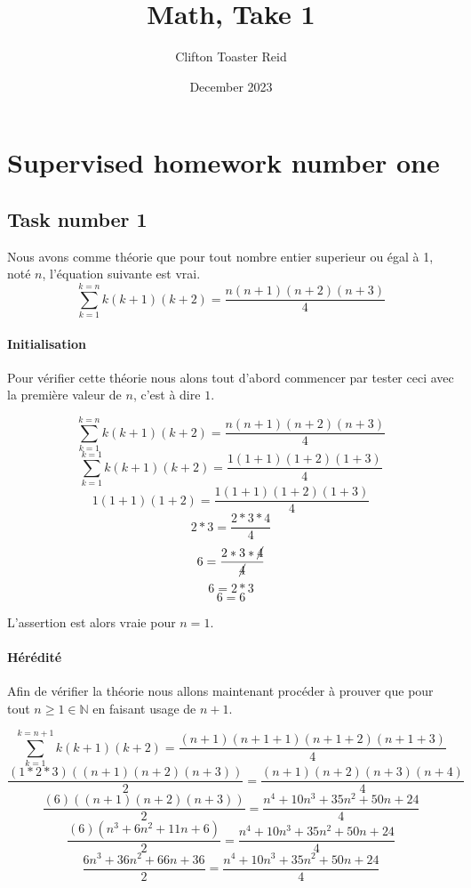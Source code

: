 \documentclass{article}
\title{Math, Take 1}
\author{Clifton Toaster Reid}
\date{December 2023}
\begin{document}
\maketitle

\section{Supervised homework number one}
\subsection{Task number 1}

Nous avons comme théorie que pour tout nombre entier superieur ou égal à 1, noté $n$, l'équation suivante est vrai.
\[\sum_{k=1}^{k=n} k(k+1)(k+2) = \frac{n(n+1)(n+2)(n+3)}{4}\]

\paragraph*{Initialisation}

Pour vérifier cette théorie nous alons tout d'abord commencer par tester ceci avec la première valeur de $n$, c'est à dire $1$.

\[\sum_{k=1}^{k=n} k(k+1)(k+2) = \frac{n(n+1)(n+2)(n+3)}{4}\]
\[\sum_{k=1}^{k=1} k(k+1)(k+2) = \frac{1(1+1)(1+2)(1+3)}{4}\]
\[1(1+1)(1+2) = \frac{1(1+1)(1+2)(1+3)}{4}\]
\[2*3 = \frac{2*3*4}{4}\]
\[6 = \frac{2*3*\cancel{4}}{\cancel{4}}\]
\[6 = 2*3\]
\[6 = 6\]

L'assertion est alors vraie pour \(n=1\).

\paragraph*{Hérédité}

Afin de vérifier la théorie nous allons maintenant procéder à prouver que pour tout \(n\geq1\in \mathbb{N}\) en faisant usage de \(n+1\).

\[\sum_{k=1}^{k=n+1} k(k+1)(k+2) = \frac{(n+1)(n+1+1)(n+1+2)(n+1+3)}{4}\]
\[\frac{(1*2*3)((n+1)(n+2)(n+3))}{2} = \frac{(n+1)(n+2)(n+3)(n+4)}{4}\]
\[\frac{(6)((n+1)(n+2)(n+3))}{2} = \frac{n^4 + 10n^3 + 35n^2 + 50n + 24}{4}\]
\[\frac{(6)(n^3 + 6n^2 + 11n + 6)}{2} = \frac{n^4 + 10n^3 + 35n^2 + 50n + 24}{4}\]
\[\frac{6n^3 + 36n^2 + 66n + 36}{2} = \frac{n^4 + 10n^3 + 35n^2 + 50n + 24}{4}\]
\end{document}
